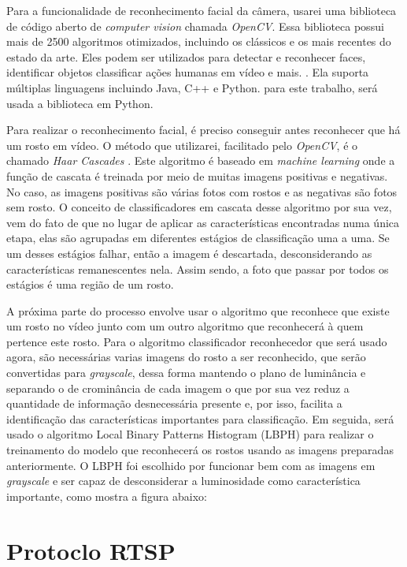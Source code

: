 \documentclass[12pt, %
openright, 
oneside, %
a4paper,    %
brazil]{facom-ufu-abntex2}
\begin{document}
Para a funcionalidade de reconhecimento facial da câmera, usarei uma biblioteca
de código aberto de \emph{computer vision} chamada \emph{OpenCV}. Essa
biblioteca possui mais de 2500 algoritmos otimizados, incluindo os clássicos e
os mais recentes do estado da arte. Eles podem ser utilizados para detectar e
reconhecer faces, identificar objetos classificar ações humanas em vídeo e
mais. \cite{opencv}. Ela suporta múltiplas linguagens incluindo Java, C++ e
Python. para este trabalho, será usada a biblioteca em Python.

Para realizar o reconhecimento facial, é preciso conseguir antes reconhecer que
há um rosto em vídeo. O método que utilizarei, facilitado pelo \emph{OpenCV}, é
o chamado \emph{Haar Cascades} \cite{viola2001rapid}. Este algoritmo é baseado
em \emph{machine learning} onde a função de cascata é treinada por meio de
muitas imagens positivas e negativas. No caso, as imagens positivas são várias
fotos com rostos e as negativas são fotos sem rosto. O conceito de
classificadores em cascata desse algoritmo por sua vez, vem do fato de que no
lugar de aplicar as características encontradas numa única etapa, elas são
agrupadas em diferentes estágios de classificação uma a uma. Se um desses
estágios falhar, então a imagem é descartada, desconsiderando as
características remanescentes nela. Assim sendo, a foto que passar por todos os
estágios é uma região de um rosto.

A próxima parte do processo envolve usar o algoritmo que reconhece que existe
um rosto no vídeo junto com um outro algoritmo que reconhecerá à quem pertence
este rosto. Para o algoritmo classificador reconhecedor que será usado agora,
são necessárias varias imagens do rosto a ser reconhecido, que serão
convertidas para \emph{grayscale}, dessa forma mantendo o plano de luminância e
separando o de crominância de cada imagem o que por sua vez reduz a quantidade
de informação desnecessária presente e, por isso, facilita a identificação das
características importantes para classificação. Em seguida, será usado o
algoritmo Local Binary Patterns Histogram (LBPH) para realizar o treinamento do
modelo que reconhecerá os rostos usando as imagens preparadas anteriormente. O
LBPH foi escolhido por funcionar bem com as imagens em \emph{grayscale} e ser
capaz de desconsiderar a luminosidade como característica importante, como
mostra a figura abaixo:

\section{Protoclo RTSP}
\end{document}
